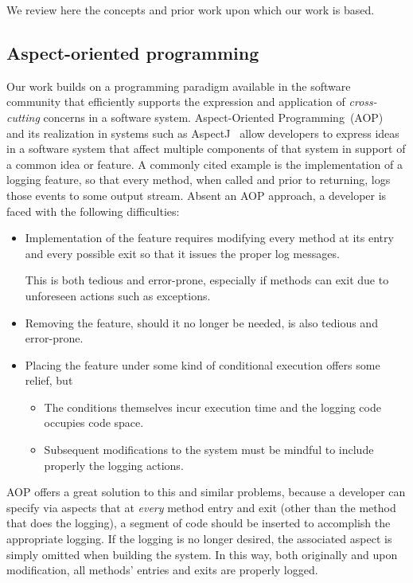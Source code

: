 \documentclass[sigplan,anonymous, review]{acmart}
\begin{document}
We review here the concepts and prior work upon which our work is based.
\subsection{Aspect-oriented programming}

Our work builds on a programming paradigm available in the software community that efficiently supports the expression and application of \emph{cross-cutting} concerns in a software system.  Aspect-Oriented Programming~(AOP)~\cite{gregor:97} and its realization in systems such as AspectJ~\cite{aspectj} allow developers to express ideas in a software system that affect multiple components of that system in support of a common idea or feature. A commonly cited example is the implementation of a logging feature, so that every method, when called and prior to returning, logs those events to some output stream. Absent an AOP approach, a developer is faced with the following difficulties:
\begin{itemize}
    \item Implementation of the feature requires modifying every method at its entry and every possible exit so that it issues the proper log messages.  
    
    This is both tedious and error-prone, especially if methods can exit due to unforeseen actions such as exceptions.
    \item Removing the feature, should it no longer be needed, is also tedious and error-prone.
    \item Placing the feature under some kind of conditional execution offers some relief, but
    \begin{itemize}
        \item The conditions themselves incur execution time and the logging code occupies code space.
        \item Subsequent modifications to the system must be mindful to include properly the logging actions.
    \end{itemize}
\end{itemize}
AOP offers a great solution to this and similar problems, because a developer can specify via aspects that at \emph{every} method entry and exit (other than the method that does the logging), a segment of code should be inserted to accomplish the appropriate logging.  If the logging is no longer desired, the associated aspect is simply omitted when building the system.  In this way, both originally and upon modification, all methods' entries and exits are properly logged.
\end{document}
